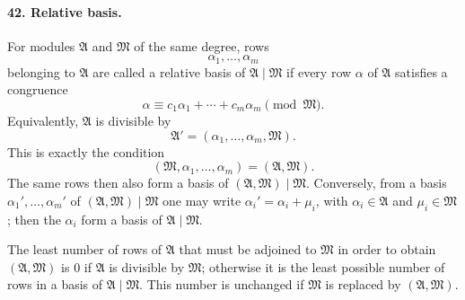 \documentclass[11pt]{article}
\begin{document}
\paragraph{42. Relative basis.}
For modules $\mathfrak A$ and $\mathfrak M$ of the same degree, rows
\begin{equation}
\alpha_1,
\ldots,
\alpha_m
\tag{56}
\end{equation}
belonging to $\mathfrak A$ are called a relative basis of $\mathfrak A\mid\mathfrak M$ if every row $\alpha$ of $\mathfrak A$ satisfies a congruence
\[
\alpha\equiv c_1\alpha_1+
\cdots+c_m\alpha_m\pmod{\mathfrak M}.
\]
Equivalently, $\mathfrak A$ is divisible by
\begin{equation}
\mathfrak A'=(\alpha_1,
\ldots,
\alpha_m,
\mathfrak M).
\tag{57}
\end{equation}
This is exactly the condition
\begin{equation}
(\mathfrak M,
\alpha_1,
\ldots,
\alpha_m)=(\mathfrak A,
\mathfrak M).
\tag{58}
\end{equation}
The same rows then also form a basis of $(\mathfrak A,
\mathfrak M)\mid\mathfrak M$. Conversely, from a basis $\alpha_1',
\ldots,
\alpha_m'$ of $(\mathfrak A,
\mathfrak M)\mid\mathfrak M$ one may write $\alpha_i'=\alpha_i+
\mu_i$, with $\alpha_i\in\mathfrak A$ and $\mu_i\in\mathfrak M$; then the $\alpha_i$ form a basis of $\mathfrak A\mid\mathfrak M$.

The least number of rows of $\mathfrak A$ that must be adjoined to $\mathfrak M$ in order to obtain $(\mathfrak A,
\mathfrak M)$ is $0$ if $\mathfrak A$ is divisible by $\mathfrak M$; otherwise it is the least possible number of rows in a basis of $\mathfrak A\mid\mathfrak M$. This number is unchanged if $\mathfrak M$ is replaced by $(\mathfrak A,
\mathfrak M)$.
\end{document}
